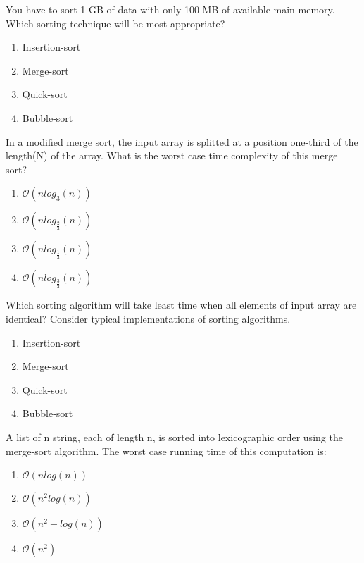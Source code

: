 \begin{problem}
You have to sort 1 GB of data with only 100 MB of available main memory. Which sorting technique will be most appropriate?
\begin{enumerate}
\item Insertion-sort
\item Merge-sort
\item Quick-sort
\item Bubble-sort
\end{enumerate}

\end{problem}


\begin{problem}
In a modified merge sort, the input array is splitted at a position one-third of the length(N) of the array. What is the worst case time complexity of this merge sort?
\begin{enumerate}
\item $\mathcal{O}(nlog_3(n))$
\item $\mathcal{O}(nlog_{\frac{2}{3}}(n))$
\item $\mathcal{O}(nlog_{\frac{1}{3}}(n))$
\item $\mathcal{O}(nlog_{\frac{3}{2}}(n))$

\end{enumerate}

\end{problem}


\begin{problem}
Which sorting algorithm will take least time when all elements of input array are identical? Consider typical implementations of sorting algorithms.
\begin{enumerate}
\item Insertion-sort
\item Merge-sort
\item Quick-sort
\item Bubble-sort
\end{enumerate}

\end{problem}


\begin{problem}
A list of n string, each of length n, is sorted into lexicographic order using the merge-sort algorithm. The worst case running time of this computation is:
\begin{enumerate}
\item $\mathcal{O}(nlog(n))$
\item $\mathcal{O}(n^2log(n))$
\item $\mathcal{O}(n^2 + log(n))$
\item $\mathcal{O}(n^2)$
\end{enumerate}

\end{problem}


